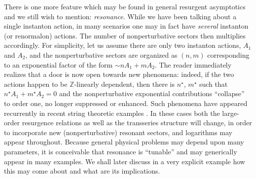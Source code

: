\documentclass[11pt,a4paper]{article}
\def\BZ{{\mathbb Z}}
\begin{document}
There is one more feature which may be found in general resurgent asymptotics and we still wish to mention: \textit{resonance}. While we have been talking about a single instanton action, in many scenarios one may in fact have \textit{several} instanton (or renormalon) actions. The number of nonperturbative sectors then multiplies accordingly. For simplicity, let us assume there are only two instanton actions, $A_1$ and $A_2$, and the nonperturbative sectors are organized as $(n,m)$ corresponding to an exponential factor of the form $\sim n A_1 + m A_2$. The reader immediately realizes that a door is now open towards new phenomena: indeed, if the two actions happen to be $\BZ$-linearly dependent, then there is $n^\star$, $m^\star$ such that $n^\star A_1 + m^\star A_2 = 0$ and the nonperturbative exponential contributions ``collapse'' to order one, no longer suppressed or enhanced. Such phenomena have appeared recurrently in recent string theoretic examples \cite{gikm10, asv11, sv13}. In these cases both the large-order resurgence relations as well as the transseries structure will change, in order to incorporate new (nonperturbative) resonant sectors, and logarithms may appear throughout. Because general physical problems may depend upon many parameters, it is conceivable that resonance is ``tunable'' and may generically appear in many examples. We shall later discuss in a very explicit example how this may come about and what are its implications.
\end{document}
